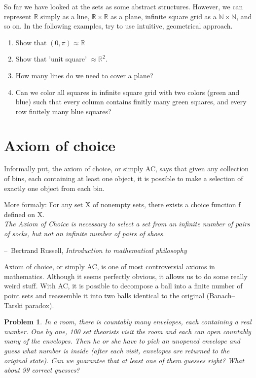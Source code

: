 \documentclass[11pt,a5paper]{article}
\makeatletter
\newtheorem{problem}{Problem}
\newenvironment{chapquote}[2][2em]
  {\setlength{\@tempdima}{#1}%
   \def\chapquote@author{#2}%
   \parshape 1 \@tempdima \dimexpr\textwidth-2\@tempdima\relax%
   \itshape}
  {\par\normalfont\hfill--\ \chapquote@author\hspace*{\@tempdima}\par\bigskip}
\makeatother
\begin{document}
\noindent So far we have looked at the sets as some abstract structures. However, we can represent $\mathbb{R}$ simply as a line, $\mathbb{R}\times\mathbb{R}$ as a plane, infinite square grid as a $\mathbb{N}\times\mathbb{N}$, and so on. In the following examples, try to use intuitive, geometrical approach.
\begin{enumerate}
  \item Show that $(0,\pi)\approx\mathbb{R}$
  \item Show that 'unit square' $\approx\mathbb{R}^2$.
  \item How many lines do we need to cover a plane?
  \item Can we color all squares in infinite square grid with two colors (green and blue) such that every column contains finitly many green squares, and every row finitely many blue squares?
\end{enumerate}

\section{Axiom of choice}

\noindent Informally put, the axiom of choice, or simply AC, says that given any collection of bins, each containing at least one object, it is possible to make a selection of exactly one object from each bin.

\noindent More formaly: For any set X of nonempty sets, there exists a choice function f defined on X.
\\

\begin{chapquote}{Bertrand Russell, \textit{Introduction to mathematical philosophy}}
\noindent The Axiom of Choice is necessary to select a set from an infinite number of pairs of socks, but not an infinite number of pairs of shoes.
\end{chapquote}	

\noindent Axiom of choice, or simply AC, is one of most controversial axioms in mathematics. Although it seems perfectly obvious, it allows us to do some really weird stuff. With AC, it is possible to decompose a ball into a finite number of point sets and reassemble it into two balls identical to the original (Banach–Tarski paradox). 

\begin{problem}
In a room, there is countably many envelopes, each containing a real number. One by one, 100 set theorists visit the room and each can open countably many of the envelopes. Then he or she have to pick an unopened envelope and guess what number is inside (after each visit, envelopes are returned to the original state). Can we guarantee that at least one of them guesses right? What about 99 correct guesses?
\end{problem}
\end{document}
